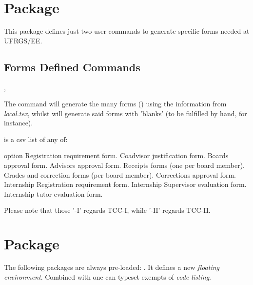 \documentclass[article,nogeometry,english,tocdepth=3,secdepth=3]{ufrgscca} %
\begin{document}
\section{ Package}
This package defines just two user commands to generate specific forms needed at UFRGS/EE.
\subsection{Forms Defined Commands}\label{forms.commands}
\begin{codedescribe}[code,update=2023/05/29]{\tcforms,\tcemptyforms}
	\begin{codesyntax}%
\end{codesyntax}
The command \tsmacro{\tcforms}{} will generate the many forms () using the information from \emph{local.tex}, whilst \tsmacro{\tcemptyforms}{} will generate said forms with 'blanks' (to be fulfilled by hand, for instance).

\end{codedescribe}

 is a csv list of any of:
\begin{describelist*}{option}
     {}
     { Registration requirement form.}
     {}
     { Coadvisor justification form.}
     {}
     { Boards approval form.}
     {}
     { Advisors approval form.}
     { Receipts forms (one per board member).}
     {}
     { Grades and correction forms (per board member).}
     {}
     { Corrections approval  form.}
     { Internship Registration requirement form.}
     { Internship Supervisor evaluation form.}
     { Internship tutor evaluation form.}
\end{describelist*}
Please note that those '-I' regards TCC-I, while '-II' regards TCC-II.


\section{ Package}
The following packages are always pre-loaded: .
It defines a new \emph{floating environment}. Combined with  one can typeset exempts of \emph{code listing}.
\end{document}

